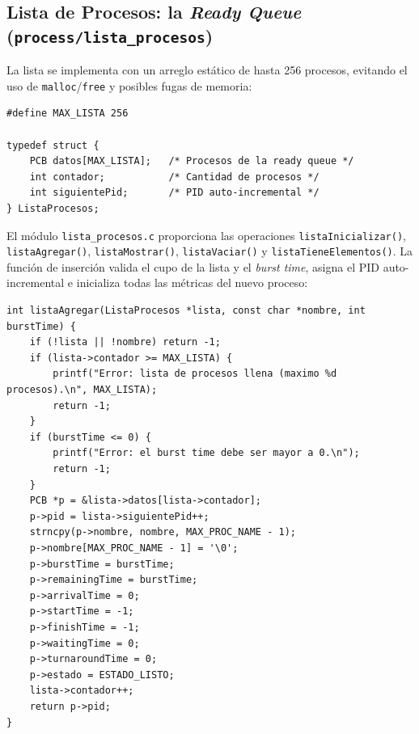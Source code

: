 \documentclass[12pt]{article}
\begin{document}
    \subsection{Lista de Procesos: la \textit{Ready Queue} (\texttt{process/lista\_procesos})}
    La lista se implementa con un arreglo estático de hasta 256 procesos, evitando el uso de \texttt{malloc}/\texttt{free} y posibles fugas de memoria:
    \begin{lstlisting}[caption={Estructura de la lista de procesos en lista_procesos.h.}]
#define MAX_LISTA 256

typedef struct {
    PCB datos[MAX_LISTA];   /* Procesos de la ready queue */
    int contador;           /* Cantidad de procesos */
    int siguientePid;       /* PID auto-incremental */
} ListaProcesos;
    \end{lstlisting}
    El módulo \texttt{lista\_procesos.c} proporciona las operaciones \texttt{listaInicializar()}, \texttt{listaAgregar()}, \texttt{listaMostrar()}, \texttt{listaVaciar()} y \texttt{listaTieneElementos()}. La función de inserción valida el cupo de la lista y el \textit{burst time}, asigna el PID auto-incremental e inicializa todas las métricas del nuevo proceso:
    \begin{lstlisting}[caption={Insercion de un proceso nuevo en la lista (lista_procesos.c).}]
int listaAgregar(ListaProcesos *lista, const char *nombre, int burstTime) {
    if (!lista || !nombre) return -1;
    if (lista->contador >= MAX_LISTA) {
        printf("Error: lista de procesos llena (maximo %d procesos).\n", MAX_LISTA);
        return -1;
    }
    if (burstTime <= 0) {
        printf("Error: el burst time debe ser mayor a 0.\n");
        return -1;
    }
    PCB *p = &lista->datos[lista->contador];
    p->pid = lista->siguientePid++;
    strncpy(p->nombre, nombre, MAX_PROC_NAME - 1);
    p->nombre[MAX_PROC_NAME - 1] = '\0';
    p->burstTime = burstTime;
    p->remainingTime = burstTime;
    p->arrivalTime = 0;
    p->startTime = -1;
    p->finishTime = -1;
    p->waitingTime = 0;
    p->turnaroundTime = 0;
    p->estado = ESTADO_LISTO;
    lista->contador++;
    return p->pid;
}
    \end{lstlisting}

\newpage
\end{document}
